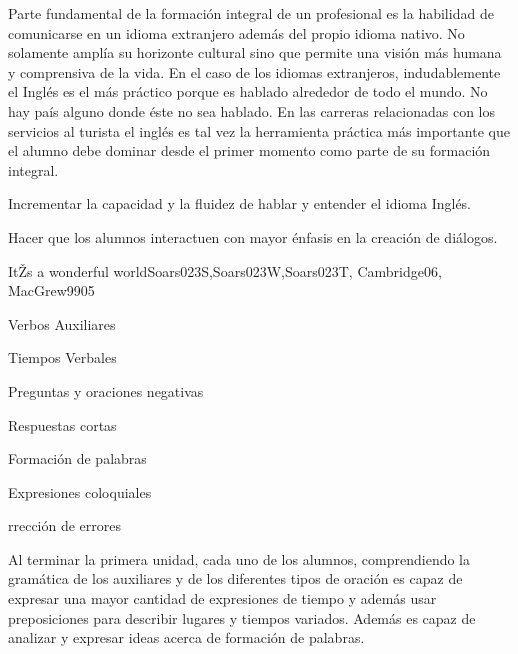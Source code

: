 \begin{syllabus}


\begin{justification}
Parte fundamental de la formación integral de un profesional es la 
habilidad de comunicarse en un idioma extranjero además del propio idioma 
nativo. No solamente amplía su horizonte cultural sino que permite una visión 
más humana y comprensiva de la vida. En el caso de los idiomas extranjeros, 
indudablemente el Inglés es el más práctico porque es hablado alrededor de 
todo el mundo. No hay país alguno donde éste no sea hablado. En las carreras 
relacionadas con los servicios al turista el inglés es tal vez la herramienta 
práctica más importante que el alumno debe dominar desde el primer momento 
como parte de su formación integral.
\end{justification}

\begin{goals}
\item Incrementar la capacidad y la fluidez de hablar y entender el idioma Inglés.
\item Hacer que los alumnos interactuen con mayor énfasis en la creación de diálogos.
\end{goals}

\begin{outcomes}
\end{outcomes}

\begin{unit}{ItŽs a wonderful world}{Soars023S,Soars023W,Soars023T, Cambridge06, MacGrew99}{0}{5}
   \begin{topics}
      \item Verbos Auxiliares
      \item Tiempos Verbales 
      \item Preguntas y oraciones negativas
      \item Respuestas cortas 
      \item Formación de palabras
      \item Expresiones coloquiales
      \item rrección de errores 
   \end{topics}

   \begin{unitgoals}
      \item Al terminar la primera unidad, cada uno de los alumnos, comprendiendo la gramática de los auxiliares y de los diferentes tipos de oración es capaz de expresar una mayor cantidad de expresiones de tiempo y además usar preposiciones para describir lugares y tiempos variados. Además es capaz de analizar y expresar ideas acerca de formación de palabras.
   \end{unitgoals}
\end{unit}


\end{syllabus}
